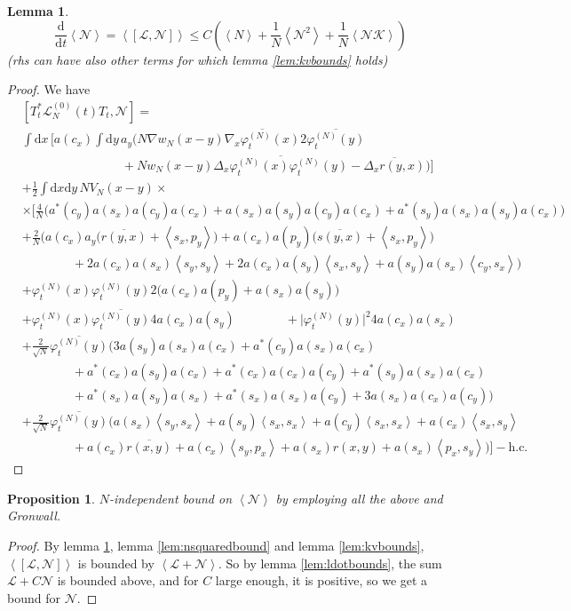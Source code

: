 \documentclass[11pt,a4paper,twoside,headsepline]{scrartcl}
\newtheorem{prp}[thm]{Proposition}
\newtheorem{lem}[thm]{Lemma}
\newcommand{\di}{\textrm{d}}		%
\newcommand{\Lcal}{\mathcal{L}}		%
\newcommand{\Ncal}{\mathcal{N}}		%
\newcommand{\Kcal}{\mathcal{K}}		%
\newcommand{\hc}{\mbox{h.c.}}		%
\newcommand{\scal}[2]{\left<#1,#2\right>} %
\newcommand{\cc}[1]{\overline{#1}}	%
\newcommand{\ev}[1]{\left<#1\right>}	%
\newcommand{\ph}{\varphi_t^{(N)}}	%
\newcommand{\bd}{\begin{displaymath}}			%
\newcommand{\ed}{\end{displaymath}}
\begin{document}
\begin{lem}
\label{lem:lncommutatorbound}
 \bd
  \frac{\di}{\di t}\ev{\Ncal} = \ev{[\Lcal,\Ncal]} \leq C \left( \ev{N} + \frac{1}{N}\ev{\Ncal^2} + \frac{1}{N} \ev{\Ncal \Kcal} \right)
 \ed
(rhs can have also other terms for which lemma \ref{lem:kvbounds} holds)
\end{lem}
\begin{proof}
We have
\begin{align*}
& [T^*_t \Lcal_N^{(0)}(t) T_t,\Ncal] = \\ 
& \int \di x\, \bigg[ a(c_x) \int \di y\, a_y \Big( N \nabla w_N(x-y) \cc{\nabla_x \ph(x)} 2 \cc{\ph(y)} \\
& \qquad\qquad \qquad\qquad						+ Nw_N(x-y) \cc{\Delta_x \ph(x) \ph(y)} - \cc{\Delta_x r(y,x)} \Big) \bigg]\\
& + \frac{1}{2}\int \di x \di y\, NV_N(x-y) \times \\
& \times \Big[   \frac{4}{N}\bigg( a^*(c_y)a(s_x)a(c_y)a(c_x) + a(s_x)a(s_y)a(c_y)a(c_x) + a^*(s_y)a(s_x)a(s_y)a(c_x) \bigg) \\
& + \frac{2}{N}\bigg(  a(c_x) a_y \Big( \cc{r(y,x)} + \scal{s_x}{p_y} \Big) + a(c_x) a(p_y) \Big( \cc{s(y,x)} + \scal{s_x}{p_y} \Big) \\
			& \qquad\qquad + 2 a(c_x) a(s_x) \scal{s_y}{s_y} + 2 a(c_x)a(s_y) \scal{s_x}{s_y} + a(s_y) a(s_x) \scal{c_y}{s_x} \bigg)\\
& + \ph(x)\ph(y) 2\Big(  a(c_x) a(p_y) + a(s_x) a(s_y) \Big) \\
& + \ph(x) \cc{\ph(y)} 4 a(c_x) a(s_y) \qquad \qquad + \lvert \ph(y) \rvert^2 4 a(c_x) a(s_x) \\
& + \frac{2}{\sqrt{N}}\cc{\ph(y)} \bigg(   3 a(s_y)a(s_x)a(c_x) + a^*(c_y)a(s_x)a(c_x) \\
					    & \qquad\qquad + a^*(c_x)a(s_y)a(c_x) + a^*(c_x) a(c_x) a(c_y) + a^*(s_y) a(s_x) a(c_x)\\
					    & \qquad\qquad + a^*(s_x)a(s_y)a(s_x) + a^*(s_x) a(s_x) a(c_y) + 3 a(s_x) a(c_x) a(c_y) \bigg) \\
& + \frac{2}{\sqrt{N}}\cc{\ph(y)} \bigg(    a(s_x) \scal{s_y}{s_x} + a(s_y) \scal{s_x}{s_x}  + a(c_y) \scal{s_x}{s_x} + a(c_x) \scal{s_x}{s_y} \\
					    & \qquad\qquad + a(c_x)\cc{r(x,y)} + a(c_x)\scal{s_y}{p_x} + a(s_x)r(x,y) + a(s_x)\scal{p_x}{s_y}  \bigg)    \Big] - \hc
\end{align*}
\end{proof}


\begin{prp}
 $N$-independent bound on $\ev{\Ncal}$ by employing all the above and Gronwall.
\end{prp}
\begin{proof}
 By lemma \ref{lem:lncommutatorbound}, lemma \ref{lem:nsquaredbound} and lemma \ref{lem:kvbounds}, $\ev{[\Lcal,\Ncal]}$ is bounded by $\ev{\Lcal+\Ncal}$. So by lemma \ref{lem:ldotbounds}, the sum $\Lcal+C \Ncal$ is bounded above, and for $C$ large enough, it is positive, so we get a bound for $\Ncal$.
\end{proof}
\end{document}
